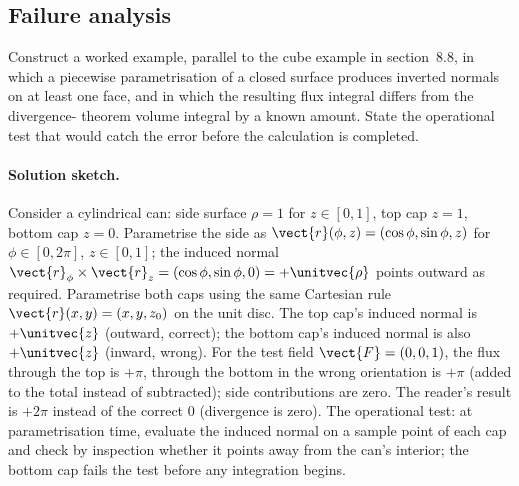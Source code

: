 \subsection*{Failure analysis}

\begin{exercise}
Construct a worked example, parallel to the cube example in
section~8.8, in which a piecewise parametrisation of a closed
surface produces inverted normals on at least one face, and in
which the resulting flux integral differs from the divergence-
theorem volume integral by a known amount. State the operational
test that would catch the error before the calculation is
completed.

\paragraph{Solution sketch.} Consider a cylindrical can: side
surface $\rho = 1$ for $z \in [0, 1]$, top cap $z = 1$, bottom cap
$z = 0$. Parametrise the side as $\vect{r}(\phi, z) = (\cos\phi,
\sin\phi, z)$ for $\phi \in [0, 2\pi]$, $z \in [0, 1]$; the induced
normal $\vect{r}_{\phi}\times\vect{r}_{z} = (\cos\phi, \sin\phi,
0) = +\unitvec{\rho}$ points outward as required. Parametrise both
caps using the same Cartesian rule $\vect{r}(x, y) = (x, y, z_{0})$
on the unit disc. The top cap's induced normal is $+\unitvec{z}$
(outward, correct); the bottom cap's induced normal is also
$+\unitvec{z}$ (inward, wrong). For the test field $\vect{F} = (0,
0, 1)$, the flux through the top is $+\pi$, through the bottom in
the wrong orientation is $+\pi$ (added to the total instead of
subtracted); side contributions are zero. The reader's result is
$+2\pi$ instead of the correct $0$ (divergence is zero). The
operational test: at parametrisation time, evaluate the induced
normal on a sample point of each cap and check by inspection
whether it points away from the can's interior; the bottom cap fails
the test before any integration begins.
\end{exercise}

